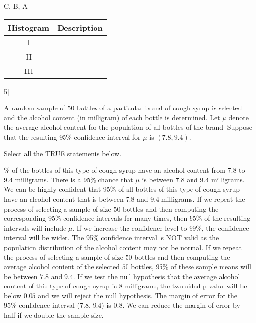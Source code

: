 \documentclass[
  12pt,
]{exam}
\begin{document}
\begin{questions}
\begin{parts}
\begin{solution}

C, B, A

\end{solution}

\end{parts}

\begin{minipage}[t]{0.68\linewidth} 

\begin{flushright}
\begin{tabular}{|c|c|}
\hline
Histogram & Description \\
\hline
I & \\
\hline
II & \\
\hline
III & \\
\hline
\end{tabular}
\end{flushright}
\end{minipage}

\newpage

\titledquestion{Cough Syrup}{[}5{]}

A random sample of \(50\) bottles of a particular brand of cough syrup
is selected and the alcohol content (in milligram) of each bottle is
determined. Let \(\mu\) denote the average alcohol content for the
population of all bottles of the brand. Suppose that the resulting 95\%
confidence interval for \(\mu\) is \((7.8, 9.4)\).

Select all the TRUE statements below.

\begin{checkboxes}

\% of the bottles of this type of cough syrup have an alcohol
content from 7.8 to 9.4 milligrams. \choice There is a 95\% chance that
\(\mu\) is between 7.8 and 9.4 milligrams. \choice We can be highly
confident that 95\% of all bottles of this type of cough syrup have an
alcohol content that is between 7.8 and 9.4 milligrams.
\CorrectChoice If we repeat the process of selecting a sample of size
\(50\) bottles and then computing the corresponding 95\% confidence
intervals for many times, then 95\% of the resulting intervals will
include \(\mu\). \CorrectChoice If we increase the confidence level to
99\%, the confidence interval will be wider. \choice The 95\% confidence
interval is NOT valid as the population distribution of the alcohol
content may not be normal. \choice If we repeat the process of selecting
a sample of size \(50\) bottles and then computing the average alcohol
content of the selected \(50\) bottles, 95\% of these sample means will
be between \(7.8\) and \(9.4\). \choice If we test the null hypothesis
that the average alcohol content of this type of cough syrup is \(8\)
milligrams, the two-sided p-value will be below \(0.05\) and we will
reject the null hypothesis. \CorrectChoice The margin of error for the
95\% confidence interval (7.8, 9.4) is 0.8. \choice We can reduce the
margin of error by half if we double the sample size.


\end{checkboxes}
\end{questions}
\end{document}
